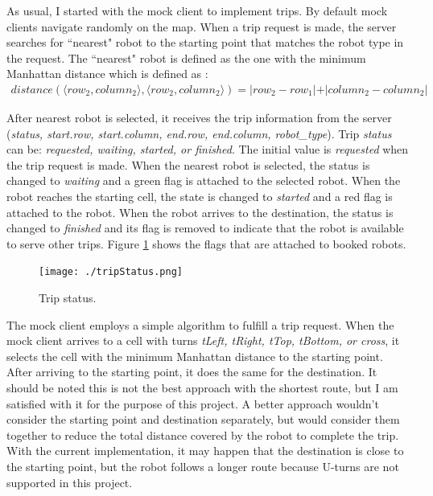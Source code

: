\documentclass[12pt,a4paper]{article}
\begin{document}
As usual, I started with the mock client to implement trips. By default mock clients navigate randomly on the map. When a trip request is made, the server searches for ``nearest" robot to the starting point that matches the robot type in the request. The ``nearest" robot is defined as the one with the minimum  Manhattan distance  which is defined as :
\begin{align*}
distance( \langle row_2, column_2\rangle, \langle row_2, column_2 \rangle) = \vert row_2 - row_1 \vert +  \vert column_2 - column_2 \vert
\end{align*}

After nearest robot is selected, it receives the trip information from the server (\textit{status,  start.row, start.column,  end.row, end.column, robot\_type}). Trip \textit{status} can be: \textit{requested, waiting, started, or finished}. The initial value is \textit{requested} when the trip request is made. When the nearest robot is selected, the status is changed to \textit{waiting} and a green flag is attached to the selected robot. When the robot reaches the starting cell, the state is changed to \textit{started} and a red flag is attached to the robot. When the robot arrives to the destination, the status is changed to \textit{finished} and its flag is removed to indicate that the robot is available to  serve other trips. Figure \ref{fig:status} shows the flags that are attached to booked robots.

\begin{figure}
\center
\texttt{[image: ./tripStatus.png]}
\caption{Trip status.} \label{fig:status}
\end{figure}

The mock client employs a simple algorithm to fulfill a trip request. When the mock client arrives to a cell with turns \textit{tLeft, tRight, tTop, tBottom, or cross}, it selects the cell with the minimum Manhattan distance to the starting point. After arriving to the starting point, it does the same for the destination. 
It should be noted this is not the best approach with the shortest route, but I am satisfied with it for the purpose of this project. A better approach wouldn't consider the starting point and destination separately, but would consider them together to reduce the total distance covered by the robot to complete the trip. With the current implementation, it may happen that the destination is close to the starting point, but the robot follows a longer route because U-turns are not supported in this project. 
\end{document}
